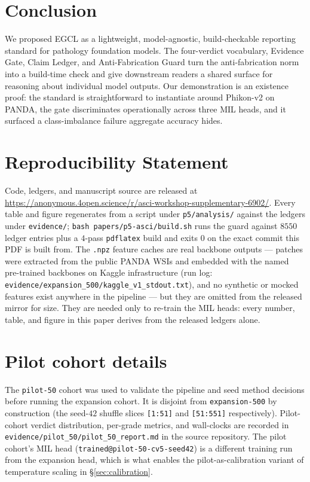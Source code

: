 \documentclass{article}
\newcommand{\SafeNum}[1]{#1}
\begin{document}
\section{Conclusion}
\label{sec:conclusion}

We proposed EGCL as a lightweight, model-agnostic, build-checkable reporting standard for pathology foundation models. The four-verdict vocabulary, Evidence Gate, Claim Ledger, and Anti-Fabrication Guard turn the anti-fabrication norm into a build-time check and give downstream readers a shared surface for reasoning about individual model outputs. Our demonstration is an existence proof: the standard is straightforward to instantiate around Phikon-v2 on PANDA, the gate discriminates operationally across three MIL heads, and it surfaced a class-imbalance failure aggregate accuracy hides.




\section*{Reproducibility Statement}

Code, ledgers, and manuscript source are released at \url{https://anonymous.4open.science/r/asci-workshop-supplementary-6902/}. Every table and figure regenerates from a script under \texttt{p5/analysis/} against the ledgers under \texttt{evidence/}; \texttt{bash papers/p5-asci/build.sh} runs the guard against $\SafeNum{8550}$ ledger entries plus a $\SafeNum{4}$-pass \texttt{pdflatex} build and exits $\SafeNum{0}$ on the exact commit this PDF is built from. The \texttt{.npz} feature caches are real backbone outputs --- patches were extracted from the public PANDA WSIs and embedded with the named pre-trained backbones on Kaggle infrastructure (run log: \texttt{evidence/expansion\_500/kaggle\_v1\_stdout.txt}), and no synthetic or mocked features exist anywhere in the pipeline --- but they are omitted from the released mirror for size. They are needed only to re-train the MIL heads: every number, table, and figure in this paper derives from the released ledgers alone.

\appendix

\section{Pilot cohort details}
\label{app:pilot}

The \texttt{pilot-50} cohort was used to validate the pipeline and seed method decisions before running the expansion cohort. It is disjoint from \texttt{expansion-500} by construction (the seed-$\SafeNum{42}$ shuffle slices \texttt{[1:51]} and \texttt{[51:551]} respectively). Pilot-cohort verdict distribution, per-grade metrics, and wall-clocks are recorded in \texttt{evidence/pilot\_50/pilot\_50\_report.md} in the source repository. The pilot cohort's MIL head (\texttt{trained@pilot-50-cv5-seed42}) is a different training run from the expansion head, which is what enables the pilot-as-calibration variant of temperature scaling in \S\ref{sec:calibration}.
\end{document}
